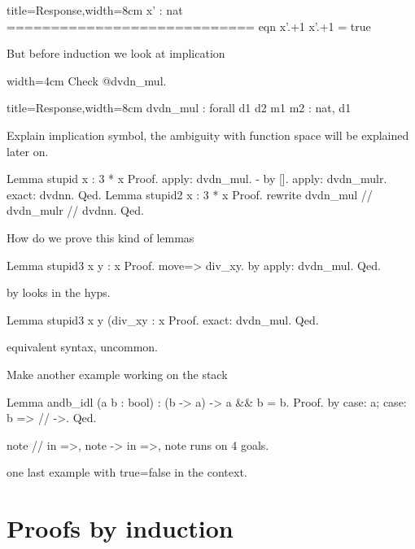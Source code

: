 \begin{coqout}{title=Response,width=8cm}
  x' : nat
  ============================
   eqn x'.+1 x'.+1 = true
\end{coqout}

But before induction we look at implication

\mcbREQUIRE{}

\begin{coq}{width=4cm}
Check @dvdn_mul.
\end{coq}
\begin{coqout}{title=Response,width=8cm}
dvdn_mul : forall d1 d2 m1 m2 : nat,
  d1 %
\end{coqout}

Explain implication symbol, the ambiguity with function space will
be explained later on.

\begin{coq}{}
Lemma stupid x : 3 * x %
Proof.
apply: dvdn_mul.
- by [].
apply: dvdn_mulr.
exact: dvdnn.
Qed.
Lemma stupid2 x : 3 * x %
Proof.
rewrite dvdn_mul // dvdn_mulr // dvdnn.
Qed.
\end{coq}

How do we prove this kind of lemmas

\begin{coq}{}
Lemma stupid3 x y : x %
Proof.
move=> div_xy.
by apply: dvdn_mul.
Qed.
\end{coq}

by looks in the hyps.

\begin{coq}{}
Lemma stupid3 x y (div_xy : x %
Proof. exact: dvdn_mul. Qed.
\end{coq}

equivalent syntax, uncommon.

Make another example working on the stack

\begin{coq}{}
Lemma andb_idl (a b : bool) : (b -> a) -> a && b = b.
Proof. by case: a; case: b => // ->. Qed.
\end{coq}

note // in =>, note -> in =>, note runs on 4 goals.

one last example with true=false in the context.

\section{Proofs by induction}

